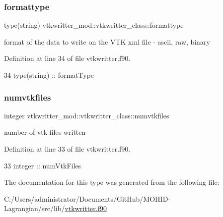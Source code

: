 \subsubsection{\texorpdfstring{formattype}{formattype}}
{\footnotesize\ttfamily type(string) vtkwritter\+\_\+mod\+::vtkwritter\+\_\+class\+::formattype\hspace{0.3cm}{\ttfamily [private]}}



format of the data to write on the V\+TK xml file -\/ ascii, raw, binary 



Definition at line 34 of file vtkwritter.\+f90.


\begin{DoxyCode}
34         \textcolor{keywordtype}{type}(string) :: formatType
\end{DoxyCode}
\mbox{\label{structvtkwritter__mod_1_1vtkwritter__class_a31a432e4d44ff478500f0f95bb8582d2}} 
\subsubsection{\texorpdfstring{numvtkfiles}{numvtkfiles}}
{\footnotesize\ttfamily integer vtkwritter\+\_\+mod\+::vtkwritter\+\_\+class\+::numvtkfiles\hspace{0.3cm}{\ttfamily [private]}}



number of vtk files written 



Definition at line 33 of file vtkwritter.\+f90.


\begin{DoxyCode}
33         \textcolor{keywordtype}{integer} :: numVtkFiles
\end{DoxyCode}


The documentation for this type was generated from the following file\+:\begin{DoxyCompactItemize}
\item 
C\+:/\+Users/administrator/\+Documents/\+Git\+Hub/\+M\+O\+H\+I\+D-\/\+Lagrangian/src/lib/\mbox{\hyperlink{vtkwritter_8f90}{vtkwritter.\+f90}}\end{DoxyCompactItemize}
